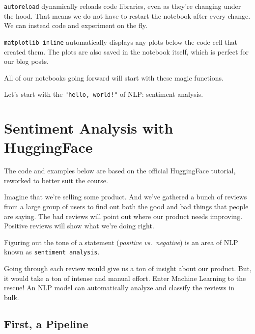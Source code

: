\documentclass[
  letterpaper,
  DIV=11,
  numbers=noendperiod]{scrartcl}
\begin{document}
\texttt{autoreload} dynamically reloads code libraries, even as they're
changing under the hood. That means we do not have to restart the
notebook after every change. We can instead code and experiment on the
fly.

\texttt{matplotlib\ inline} automatically displays any plots below the
code cell that created them. The plots are also saved in the notebook
itself, which is perfect for our blog posts.

All of our notebooks going forward will start with these magic
functions.

Let's start with the \texttt{"hello,\ world!"} of NLP: sentiment
analysis.

\section{Sentiment Analysis with
HuggingFace}\label{sentiment-analysis-with-huggingface}

\begin{tcolorbox}[enhanced jigsaw, leftrule=.75mm, colbacktitle=quarto-callout-note-color!10!white, title=\textcolor{quarto-callout-note-color}{\faInfo}\hspace{0.5em}{Note}, left=2mm, opacitybacktitle=0.6, toprule=.15mm, coltitle=black, opacityback=0, arc=.35mm, colframe=quarto-callout-note-color-frame, breakable, bottomtitle=1mm, bottomrule=.15mm, colback=white, rightrule=.15mm, titlerule=0mm, toptitle=1mm]

The code and examples below are based on the official HuggingFace
tutorial, reworked to better suit the course.

\end{tcolorbox}

Imagine that we're selling some product. And we've gathered a bunch of
reviews from a large group of users to find out both the good and bad
things that people are saying. The bad reviews will point out where our
product needs improving. Positive reviews will show what we're doing
right.

Figuring out the tone of a statement (\emph{positive vs.~negative}) is
an area of NLP known as \texttt{sentiment\ analysis}.

Going through each review would give us a ton of insight about our
product. But, it would take a ton of intense and manual effort. Enter
Machine Learning to the rescue! An NLP model can automatically analyze
and classify the reviews in bulk.

\subsection{First, a Pipeline}\label{first-a-pipeline}
\end{document}
